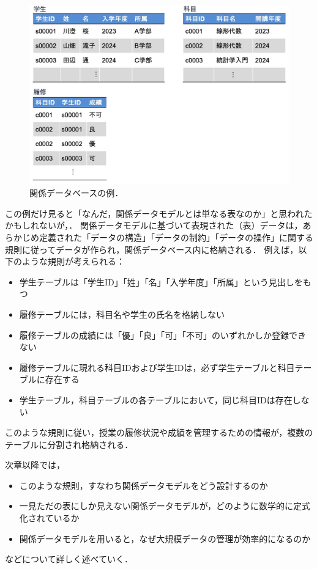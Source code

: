 \begin{figure}[tb]
    \centering
    \includegraphics[width=1.0\textwidth]{figure/example-of-relation.jpg}
    \caption{関係データベースの例．}
    \label{fig:example-of-relation}
\end{figure}
この例だけ見ると「なんだ，関係データモデルとは単なる表なのか」と思われたかもしれないが，．
関係データモデルに基づいて表現された（表）データは，あらかじめ定義された「データの構造」「データの制約」「データの操作」に関する規則に従ってデータが作られ，関係データベース内に格納される．
例えば，以下のような規則が考えられる：
\begin{itemize}
\item 学生テーブルは「学生ID」「姓」「名」「入学年度」「所属」という見出しをもつ
\item 履修テーブルには，科目名や学生の氏名を格納しない
\item 履修テーブルの成績には「優」「良」「可」「不可」のいずれかしか登録できない
\item 履修テーブルに現れる科目IDおよび学生IDは，必ず学生テーブルと科目テーブルに存在する
\item 学生テーブル，科目テーブルの各テーブルにおいて，同じ科目IDは存在しない
\end{itemize}
このような規則に従い，授業の履修状況や成績を管理するための情報が，複数のテーブルに分割され格納される．

次章以降では，
\begin{itemize}
\item このような規則，すなわち関係データモデルをどう設計するのか
\item 一見ただの表にしか見えない関係データモデルが，どのように数学的に定式化されているか
\item 関係データモデルを用いると，なぜ大規模データの管理が効率的になるのか
\end{itemize}
などについて詳しく述べていく．

